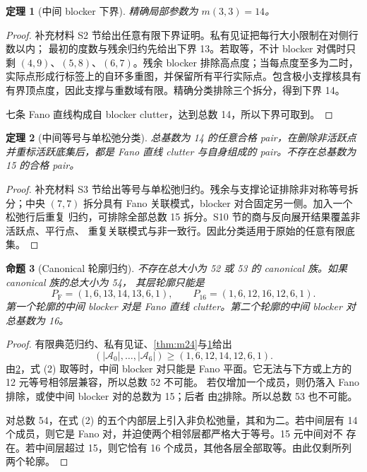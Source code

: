 \documentclass[UTF8,11pt,a4paper,fontset=fandol]{ctexart}
\newtheorem{theorem}{定理}[section]
\newtheorem{proposition}[theorem]{命题}
\theoremstyle{definition}
\theoremstyle{remark}
\begin{document}
\begin{theorem}[中间 blocker 下界]
\label{thm:m33}
精确局部参数为 $m(3,3)=14$。
\end{theorem}

\begin{proof}
补充材料 S2 节给出任意有限下界证明。私有见证把每行大小限制在对侧行数以内；
最初的度数与残余归约先给出下界 13。若取等，不计 blocker 对偶时只剩
$(4,9)$、$(5,8)$、$(6,7)$。残余 blocker 排除高点度；当每点度至多为二时，
实际点形成行标签上的自环多重图，并保留所有平行实际点。包含极小支撑核具有
有界顶点度，因此支撑与重数域有限。精确分类排除三个拆分，得到下界 14。

七条 Fano 直线构成自 blocker clutter，达到总数 14，所以下界可取到。
\end{proof}

\begin{theorem}[中间等号与单松弛分类]
\label{thm:m33-classification-main}
总基数为 14 的任意合格 pair，在删除非活跃点并重标活跃底集后，都是 Fano
直线 clutter 与自身组成的 pair。不存在总基数为 15 的合格 pair。
\end{theorem}

\begin{proof}
补充材料 S3 节给出等号与单松弛归约。残余与支撑论证排除非对称等号拆分；中央
$(7,7)$ 拆分具有 Fano 关联模式，blocker 对合固定另一侧。加入一个松弛行后重复
归约，可排除全部总数 15 拆分。S10 节的商与反向展开结果覆盖非活跃点、平行点、
重复关联模式与非一致行。因此分类适用于原始的任意有限底集。
\end{proof}

\begin{proposition}[Canonical 轮廓归约]
\label{prop:canonical-profiles}
不存在总大小为 52 或 53 的 canonical 族。如果 canonical 族的总大小为 54，
其层轮廓只能是
\[
  P_{\mathrm F}=(1,6,13,14,13,6,1),\qquad
  P_{16}=(1,6,12,16,12,6,1).
\]
第一个轮廓的中间 blocker 对是 Fano 直线 clutter。第二个轮廓的中间 blocker
对总基数为 16。
\end{proposition}

\begin{proof}
有限典范归约、私有见证、\cref{thm:m24}与\cref{thm:m33}给出
\[
  (|\mathcal A_0|,\ldots,|\mathcal A_6|)
  \geq(1,6,12,14,12,6,1).
  \tag{2}
\]
由\cref{thm:m33-classification-main}，式 (2) 取等时，中间 blocker 对只能是
Fano 平面。它无法与下方或上方的 12 元等号相邻层兼容，所以总数 52 不可能。
若仅增加一个成员，则仍落入 Fano 排除，或使中间 blocker 对的总数为 15；后者
由\cref{thm:m33-classification-main}排除。所以总数 53 也不可能。

对总数 54，在式 (2) 的五个内部层上引入非负松弛量，其和为二。若中间层有
14 个成员，则它是 Fano 对，并迫使两个相邻层都严格大于等号。15 元中间对不
存在。若中间层超过 15，则它恰有 16 个成员，其他各层全部取等。由此仅剩所列
两个轮廓。
\end{proof}
\end{document}
